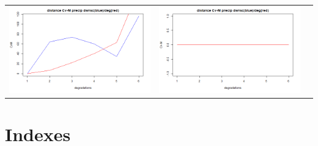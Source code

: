 \documentclass[a4paper,10pt]{article}
\begin{document}
	\vspace{0.5 cm}
	
	\hspace{-1cm}
	\begin{tabular}{ccc}
		\includegraphics[scale=0.4]{images/Dist_CVM_precip.png} & \includegraphics[scale=0.4]{images/Dist_CVM_evap.png}  \\
	\end{tabular} 
	
	
	
	
	\section{Indexes}
	
\end{document}
